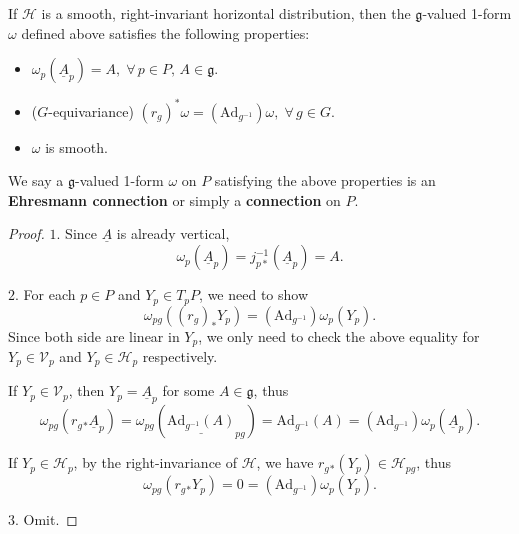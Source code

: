 \begin{theorem}
    If $\mathcal{H}$ is a smooth, right-invariant horizontal distribution, 
    then the $\mathfrak{g}$-valued 1-form $\omega$ defined above 
    satisfies the following properties:
    \begin{itemize}
        \item $\omega_p(\underline{A}_p) = A,\;\forall\,p\in P,\,A\in\mathfrak{g}$.
        \item {\rm(}$G$-equivariance{\rm)} $(r_g)^*\omega = (\mathrm{Ad}_{g^{-1}})\omega,\;\forall\,g\in G$.
        \item $\omega$ is smooth.
    \end{itemize}

    We say a $\mathfrak{g}$-valued 1-form $\omega$ on $P$ satisfying the above properties is 
    an \textbf{Ehresmann connection} or simply a \textbf{connection} on $P$.
\end{theorem}
\begin{proof}
    $\textit{1}$. Since $\underline{A}$ is already vertical, 
    \begin{equation*}
        \omega_p(\underline{A}_p) = j_{p*}^{-1}(\underline{A}_p) = A.
    \end{equation*}

    \noindent$\textit{2}$. For each $p\in P$ and $Y_p\in T_pP$, we need to show 
    \begin{equation*}
        \omega_{pg}((r_g)_*Y_p) = (\mathrm{Ad}_{g^{-1}})\omega_p(Y_p).
    \end{equation*}
    Since both side are linear in $Y_p$, we only need to check the above equality for 
    $Y_p\in \mathcal{V}_p$ and $Y_p\in \mathcal{H}_p$ respectively.

    If $Y_p\in \mathcal{V}_p$, then $Y_p = \underline{A}_p$ for some $A\in\mathfrak{g}$, thus
    \begin{equation*}
        \omega_{pg}(r_g{}_*\underline{A}_p) 
        = \omega_{pg}(\underline{\mathrm{Ad}_{g^{-1}}(A)}_{pg}) 
        = \mathrm{Ad}_{g^{-1}}(A) = (\mathrm{Ad}_{g^{-1}})\omega_p(\underline{A}_p).
    \end{equation*}

    If $Y_p\in \mathcal{H}_p$, by the right-invariance of $\mathcal{H}$, we have $r_g{}_*(Y_p)\in \mathcal{H}_{pg}$, thus 
    \begin{equation*}
        \omega_{pg}(r_g{}_*Y_p) = 0 = (\mathrm{Ad}_{g^{-1}})\omega_p(Y_p).
    \end{equation*}

    \noindent$\textit{3}$. Omit.
\end{proof}

